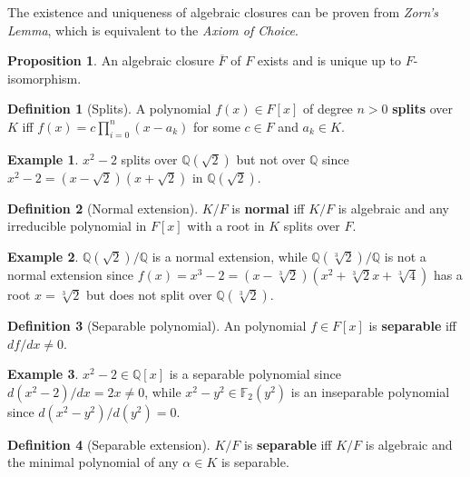 \documentclass{article}
\newcommand{\F}{\mathbb{F}}
\newcommand{\Q}{\mathbb{Q}}
\newcommand{\rb}[1]{\left( #1 \right)}
\renewcommand{\sb}[1]{\left[ #1 \right]}
\theoremstyle{definition}\newtheorem*{definition}{Definition}
\theoremstyle{definition}\newtheorem*{example}{Example}
\theoremstyle{definition}\newtheorem*{remark}{Remark}
\newtheorem{proposition}{Proposition}[subsection]
\begin{document}
The existence and uniqueness of algebraic closures can be proven from \emph{Zorn's Lemma}, which is equivalent to the \emph{Axiom of Choice}.

\begin{proposition}
An algebraic closure $ \overline{F} $ of $ F $ exists and is unique up to $ F $-isomorphism.
\end{proposition}

\begin{definition}[Splits]
A polynomial $ f\rb{x} \in F\sb{x} $ of degree $ n > 0 $ \textbf{splits} over $ K $ iff $ f\rb{x} = c\prod_{i = 0}^n \rb{x - a_k} $ for some $ c \in F $ and $ a_k \in K $.
\end{definition}

\begin{example}
$ x^2 - 2 $ splits over $ \Q\rb{\sqrt{2}} $ but not over $ \Q $ since $ x^2 - 2 = \rb{x - \sqrt{2}}\rb{x + \sqrt{2}} $ in $ \Q\rb{\sqrt{2}} $.
\end{example}

\begin{definition}[Normal extension]
$ K / F $ is \textbf{normal} iff $ K / F $ is algebraic and any irreducible polynomial in $ F\sb{x} $ with a root in $ K $ splits over $ F $.
\end{definition}

\begin{example}
$ \Q\rb{\sqrt{2}} / \Q $ is a normal extension, while $ \Q\rb{\sqrt[3]{2}} / \Q $ is not a normal extension since $ f\rb{x} = x^3 - 2 = \rb{x - \sqrt[3]{2}} \rb{x^2 + \sqrt[3]{2}x + \sqrt[3]{4}} $ has a root $ x = \sqrt[3]{2} $ but does not split over $ \Q\rb{\sqrt[3]{2}} $.
\end{example}

\begin{definition}[Separable polynomial]
An polynomial $ f \in F\sb{x} $ is \textbf{separable} iff $ df / dx \ne 0 $.
\end{definition}

\begin{example}
$ x^2 - 2 \in \Q\sb{x} $ is a separable polynomial since $ d\rb{x^2 - 2} / dx = 2x \ne 0 $, while $ x^2 - y^2 \in \F_2\rb{y^2} $ is an inseparable polynomial since $ d\rb{x^2 - y^2} / d\rb{y^2} = 0 $.
\end{example}

\begin{definition}[Separable extension]
$ K / F $ is \textbf{separable} iff $ K / F $ is algebraic and the minimal polynomial of any $ \alpha \in K $ is separable.
\end{definition}
\end{document}
